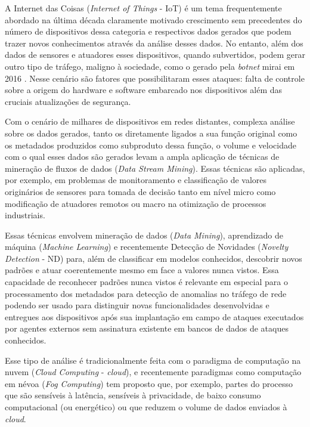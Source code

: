 A Internet das Coisas (\emph{Internet of Things} - IoT) é um tema frequentemente
abordado na última década claramente motivado crescimento sem precedentes do
número de dispositivos dessa categoria e respectivos dados gerados que podem
trazer novos conhecimentos através da análise desses dados. No entanto, além dos
dados de sensores e atuadores esses dispositivos, quando subvertidos, podem
gerar outro tipo de tráfego, maligno à sociedade, como o gerado pela
\emph{botnet} mirai em 2016 \cite{Kambourakis2017}. Nesse cenário são fatores
que possibilitaram esses ataques: falta de controle sobre a origem do hardware e
software embarcado nos dispositivos além das cruciais atualizações de segurança.

Com o cenário de milhares de dispositivos em redes distantes, complexa análise
sobre os dados gerados, tanto os diretamente ligados a sua função original como
os metadados produzidos como subproduto dessa função, o volume e velocidade com
o qual esses dados são gerados levam a ampla aplicação de técnicas de mineração
de fluxos de dados (\emph{Data Stream Mining}). Essas técnicas são aplicadas,
por exemplo, em problemas de monitoramento e classificação de valores
originários de sensores para tomada de decisão tanto em nível micro como
modificação de atuadores remotos ou macro na otimização de processos
industriais.

Essas técnicas envolvem mineração de dados (\emph{Data Mining}), aprendizado de
máquina (\emph{Machine Learning}) e recentemente Detecção de Novidades
(\emph{Novelty Detection} - ND) para, além de classificar em modelos conhecidos,
descobrir novos padrões e atuar coerentemente mesmo em face a valores nunca
vistos. Essa capacidade de reconhecer padrões nunca vistos é relevante em
especial para o processamento dos metadados para detecção de anomalias no
tráfego de rede podendo ser usado para distinguir novas funcionalidades
desenvolvidas e entregues aos dispositivos após sua implantação em campo de
ataques executados por agentes externos sem assinatura existente em bancos de
dados de ataques conhecidos.

Esse tipo de análise é tradicionalmente feita com o paradigma de
computação na nuvem (\emph{Cloud Computing} - \emph{cloud}), e recentemente
paradigmas como computação em névoa (\emph{Fog Computing}) tem proposto que, por
exemplo, partes do processo que são sensíveis à latência, sensíveis à
privacidade, de baixo consumo computacional (ou energético) ou que reduzem o
volume de dados enviados à \emph{cloud}.

